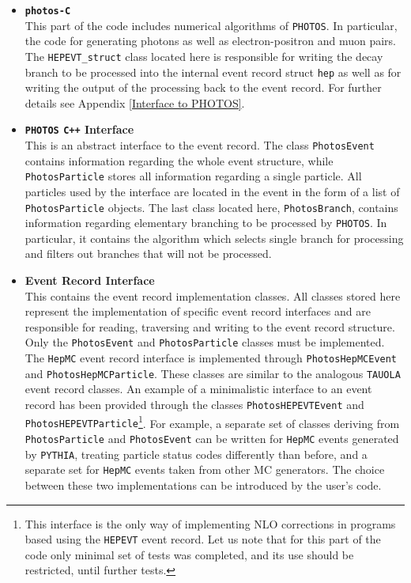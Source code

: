 \documentclass[]{Photos_interface_design}
\begin{document}
\begin{itemize}
  \item {\bf {\tt photos-C} }\\
       This part of the code includes numerical algorithms of {\tt PHOTOS}. In particular,
       the code for generating photons as well as electron-positron and muon pairs.
       The {\tt HEPEVT\_struct} class located here is responsible for writing
       the decay branch to be processed into the internal event record struct {\tt hep} as
       well as for writing the output of the processing back to the event record.
       For further details see Appendix \ref{Interface to PHOTOS}.
  \item {\bf {\tt PHOTOS} {\tt C++} Interface} \\
       This is an abstract interface to the event record.
       The class {\tt PhotosEvent} contains information regarding the whole event
       structure, while {\tt PhotosParticle} stores all information regarding a single particle.
       All particles used by the interface are located in the event in the form of
       a list of {\tt PhotosParticle} objects.
       The last class located here, {\tt PhotosBranch}, contains information regarding
       elementary branching to be processed by {\tt PHOTOS}. In particular, 
       it contains the algorithm
       which selects single branch for processing and filters out branches that will not be processed.
  \item {\bf Event Record Interface} \\
       This contains the event record implementation classes. All classes stored here represent
       the implementation of specific event record interfaces and are responsible for reading,
       traversing and writing to the event record structure.
       Only the {\tt PhotosEvent} and {\tt PhotosParticle} classes must be implemented.
       The {\tt HepMC} event record interface is implemented
       through {\tt PhotosHepMCEvent} and {\tt PhotosHepMCParticle}. These classes are similar to the
       analogous {\tt TAUOLA} \cite{Davidson:2010rw} event record classes.
       An example of a minimalistic interface to an event record has been provided
       through the classes {\tt PhotosHEPEVTEvent} and {\tt PhotosHEPEVTParticle}\footnote{This interface is the 
       only way of implementing NLO corrections in programs based using the {\tt HEPEVT} event record.
       Let us note that for this part of the code only minimal set of  tests was completed, and its use should be restricted, until further tests.}.
       For example, a separate set of classes deriving from {\tt PhotosParticle} and {\tt PhotosEvent}
       can be written for {\tt HepMC} events generated by {\tt PYTHIA}, treating particle status codes
       differently than before, and a separate set for {\tt HepMC} events taken from other MC generators.
       The choice between these two implementations can be introduced by the user's code.
\end{itemize}
\end{document}
